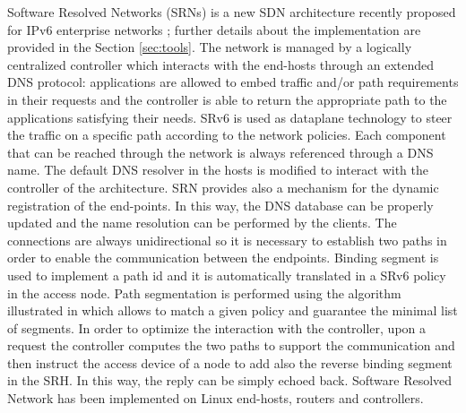 Software Resolved Networks (SRNs) is a new SDN architecture recently proposed for IPv6 enterprise networks \cite{lebrun2018software}\cite{duchene2018exploring}; further details about the implementation are provided in the Section \ref{sec:tools}. The network is managed by a logically centralized controller which interacts with the end-hosts through an extended DNS protocol: applications are allowed to embed traffic and/or path requirements in their requests and the controller is able to return the appropriate path to the applications satisfying their needs. SRv6 is used as dataplane technology to steer the traffic on a specific path according to the network policies. Each component that can be reached through the network is always referenced through a DNS name. The default DNS resolver in the hosts is modified to interact with the controller of the architecture. SRN provides also a mechanism for the dynamic registration of the end-points. In this way, the DNS database can be properly updated and the name resolution can be performed by the clients. The connections are always unidirectional so it is necessary to establish two paths in order to enable the communication between the endpoints. Binding segment is used to implement a path id and it is automatically translated in a SRv6 policy in the access node. Path segmentation is performed using the algorithm illustrated in \cite{scmon} which allows to match a given policy and guarantee the minimal list of segments. In order to optimize the interaction with the controller, upon a request the controller computes the two paths to support the communication and then instruct the access device of a node to add also the reverse binding segment in the SRH. In this way, the reply can be simply echoed back. Software Resolved Network has been implemented on Linux end-hosts, routers and controllers. %


